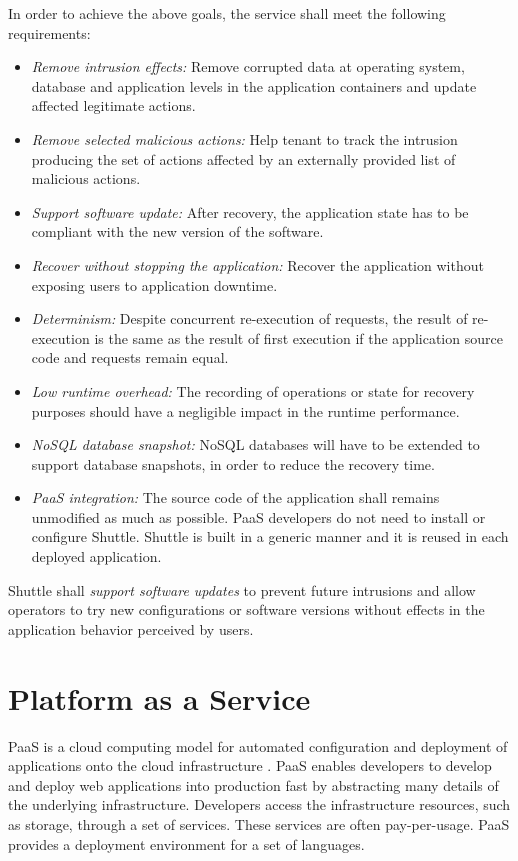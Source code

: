 In order to achieve the above goals, the service shall meet the following requirements: 
\begin{itemize}
\item \textit{Remove intrusion effects:} Remove corrupted data at operating system, database and application levels in the application containers and update affected legitimate actions.
\item \textit{Remove selected malicious actions:} Help tenant to track the intrusion producing the set of actions affected by an externally provided list of malicious actions.
\item \textit{Support software update:} After recovery, the application state has to be compliant with the new version of the software.
\item \textit{Recover without stopping the application:} Recover the application without exposing users to application downtime.
\item \textit{Determinism:} Despite concurrent re-execution of requests, the result of re-execution is the same as the result of first execution if the application source code and requests remain equal.
\item \textit{Low runtime overhead:} The recording of operations or state for recovery purposes should have a negligible impact in the runtime performance.
\item \textit{\acs{NoSQL} database snapshot:} \acs{NoSQL} databases will have to be extended to support database snapshots, in order to reduce the recovery time.
\item \textit{\ac{PaaS} integration:} The source code of the application shall remains unmodified as much as possible. \ac{PaaS} developers do not need to install or configure Shuttle. Shuttle is built in a generic manner and it is reused in each deployed application.
\end{itemize}

Shuttle shall \textit{support software updates} to prevent future intrusions and allow operators to try new configurations or software versions without effects in the application behavior perceived by users. 


\section{Platform as a Service}
\label{sec:arch:paas}
\acf{PaaS} is a cloud computing model for automated configuration and deployment of applications onto the cloud infrastructure \cite{Vaquero2008,Vaquero2011,Armbrust,Mell}. \ac{PaaS} enables developers to develop and deploy web applications into production fast by abstracting many details of the underlying infrastructure. Developers access the infrastructure resources, such as storage, through a set of services. These services are often pay-per-usage. \ac{PaaS} provides a deployment environment for a set of languages. 

